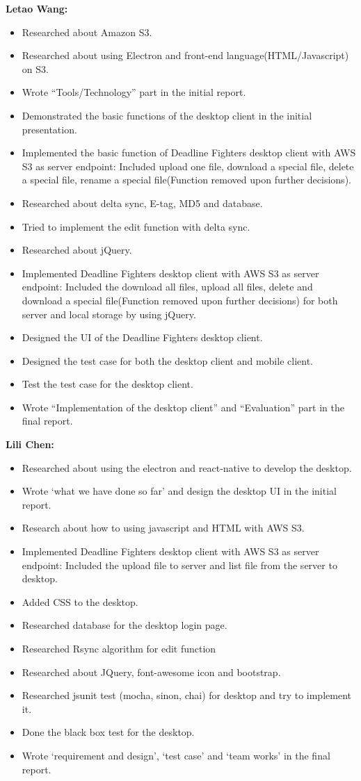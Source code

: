 \textbf{Letao Wang:}
\begin{itemize}
\item Researched about Amazon S3.
\item Researched about using Electron and front-end language(HTML/Javascript) on S3.
\item Wrote “Tools/Technology” part in the initial report.
\item Demonstrated the basic functions of the desktop client in the initial presentation.
\item Implemented the basic function of Deadline Fighters desktop client with AWS S3 as server endpoint: Included upload one file, download a special file, delete a special file, rename a special file(Function removed upon further decisions).
\item Researched about delta sync, E-tag, MD5 and database.
\item Tried to implement the edit function with delta sync.
\item Researched about jQuery.
\item Implemented Deadline Fighters desktop client with AWS S3 as server endpoint: Included the download all files, upload all files, delete and download a special file(Function removed upon further decisions) for both server and local storage by using jQuery.
\item Designed the UI of the Deadline Fighters desktop client.
\item Designed the test case for both the desktop client and mobile client.
\item Test the test case for the desktop client.
\item Wrote “Implementation of the desktop client” and “Evaluation” part in the final report.
\end{itemize}


\textbf{Lili Chen:}
\begin{itemize}
\item Researched about using the electron and react-native to develop the desktop.
\item Wrote ‘what we have done so far’ and design the desktop UI in the initial report.
\item Research about how to using javascript and HTML with AWS S3.
\item Implemented Deadline Fighters desktop client with AWS S3 as server endpoint: Included the upload file to server and list file from the server to desktop.
\item Added CSS to the desktop.
\item Researched database for the desktop login page.
\item Researched Rsync algorithm for edit function
\item Researched about JQuery, font-awesome icon and bootstrap.
\item Researched jsunit test (mocha, sinon, chai) for desktop and try to implement it.
\item Done the black box test for the desktop.
\item Wrote ‘requirement and design’, ‘test case’ and ‘team works’ in the final report.
\end{itemize}


